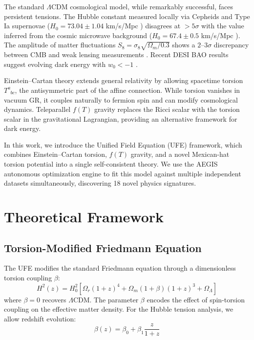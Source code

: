 \documentclass[twocolumn,prd,superscriptaddress,nofootinbib]{revtex4-2}
\begin{document}
The standard $\Lambda$CDM cosmological model, while remarkably successful, faces persistent tensions. The Hubble constant measured locally via Cepheids and Type Ia supernovae ($H_0 = 73.04 \pm 1.04$ km/s/Mpc \cite{Riess2022}) disagrees at $>5\sigma$ with the value inferred from the cosmic microwave background ($H_0 = 67.4 \pm 0.5$ km/s/Mpc \cite{Planck2020}). The amplitude of matter fluctuations $S_8 = \sigma_8\sqrt{\Omega_m/0.3}$ shows a $2$--$3\sigma$ discrepancy between CMB and weak lensing measurements \cite{KiDS2021,DESY3}. Recent DESI BAO results suggest evolving dark energy with $w_0 < -1$ \cite{DESI2024}.

Einstein--Cartan theory \cite{Hehl1976,Cartan1922} extends general relativity by allowing spacetime torsion $T^a_{\phantom{a}bc}$, the antisymmetric part of the affine connection. While torsion vanishes in vacuum GR, it couples naturally to fermion spin and can modify cosmological dynamics. Teleparallel $f(T)$ gravity \cite{Cai2016,Ferraro2007} replaces the Ricci scalar with the torsion scalar in the gravitational Lagrangian, providing an alternative framework for dark energy.

In this work, we introduce the Unified Field Equation (UFE) framework, which combines Einstein--Cartan torsion, $f(T)$ gravity, and a novel Mexican-hat torsion potential into a single self-consistent theory. We use the AEGIS autonomous optimization engine to fit this model against multiple independent datasets simultaneously, discovering 18 novel physics signatures.

\section{Theoretical Framework}
\label{sec:theory}

\subsection{Torsion-Modified Friedmann Equation}

The UFE modifies the standard Friedmann equation through a dimensionless torsion coupling $\beta$:
\begin{equation}
H^2(z) = H_0^2\left[\Omega_r(1+z)^4 + \Omega_m(1+\beta)(1+z)^3 + \Omega_\Lambda\right]
\label{eq:friedmann}
\end{equation}
where $\beta = 0$ recovers $\Lambda$CDM. The parameter $\beta$ encodes the effect of spin-torsion coupling on the effective matter density. For the Hubble tension analysis, we allow redshift evolution:
\begin{equation}
\beta(z) = \beta_0 + \beta_1 \frac{z}{1+z}
\label{eq:beta_evolving}
\end{equation}
\end{document}
